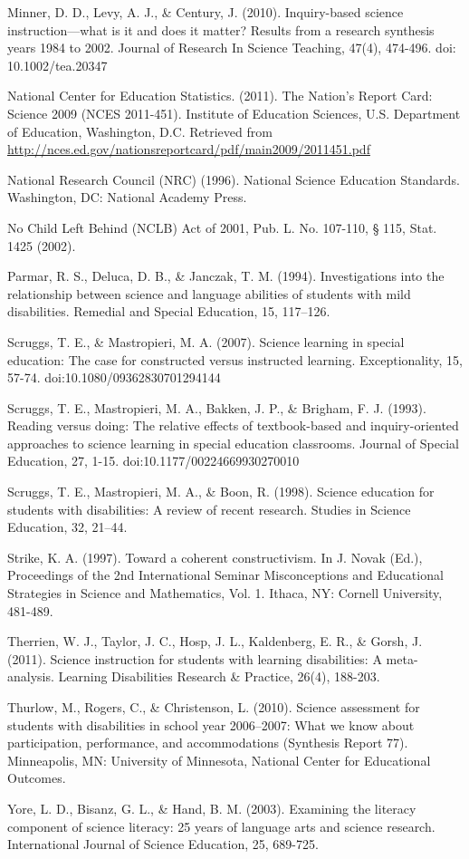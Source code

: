 \documentclass[11.5pt]{sig-alternate} %
\begin{document}
Minner, D. D., Levy, A. J., \& Century, J. (2010). Inquiry-based science instruction—what is it and does it matter? Results from a research synthesis years 1984 to 2002. Journal of Research In Science Teaching, 47(4), 474-496. doi: 10.1002/tea.20347

National Center for Education Statistics. (2011). The Nation’s Report Card: Science 2009 (NCES 2011-451). Institute of Education Sciences, U.S. Department of Education, Washington, D.C. Retrieved from \url{http://nces.ed.gov/nationsreportcard/pdf/main2009/2011451.pdf}

National Research Council (NRC) (1996). National Science Education Standards. Washington, DC: National Academy Press.

No Child Left Behind (NCLB) Act of 2001, Pub. L. No. 107-110, § 115, Stat. 1425 (2002).

Parmar, R. S., Deluca, D. B., \& Janczak, T. M. (1994). Investigations into the relationship between science and language abilities of students with mild disabilities. Remedial and Special Education, 15, 117–126.

Scruggs, T. E., \& Mastropieri, M. A. (2007). Science learning in special education: The case for constructed versus instructed learning. Exceptionality, 15, 57-74. doi:10.1080/09362830701294144

Scruggs, T. E., Mastropieri, M. A., Bakken, J. P., \& Brigham, F. J. (1993). Reading versus doing: The relative effects of textbook-based and inquiry-oriented approaches to science learning in special education classrooms. Journal of Special Education, 27, 1-15. doi:10.1177/00224669930270010

Scruggs, T. E., Mastropieri, M. A., \& Boon, R. (1998). Science education for students with disabilities: A review of recent research. Studies in Science Education, 32, 21–44.

Strike, K. A. (1997). Toward a coherent constructivism. In J. Novak (Ed.), Proceedings of the 2nd International Seminar Misconceptions and Educational Strategies in Science and Mathematics, Vol. 1. Ithaca, NY: Cornell University, 481-489.

Therrien, W. J., Taylor, J. C., Hosp, J. L., Kaldenberg, E. R., \& Gorsh, J. (2011). Science instruction for students with learning disabilities: A meta-analysis. Learning Disabilities Research \& Practice, 26(4), 188-203.

Thurlow, M., Rogers, C., \& Christenson, L. (2010). Science assessment for students with disabilities in school year 2006–2007: What we know about participation, performance, and accommodations (Synthesis Report 77). Minneapolis, MN: University of Minnesota, National Center for Educational Outcomes.

Yore, L. D., Bisanz, G. L., \& Hand, B. M. (2003). Examining the literacy component of science literacy: 25 years of language arts and science research. International Journal of Science Education, 25, 689-725.
\end{document}
